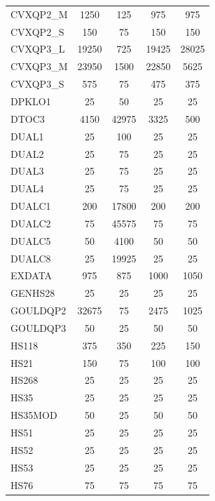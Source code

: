 \begin{longtable}{lcccc}
CVXQP2\_M &     1250 &   125 &      975 &      975 \\
CVXQP2\_S &      150 &    75 &      150 &      150 \\
CVXQP3\_L &    19250 &   725 &    19425 &    28025 \\
CVXQP3\_M &    23950 &  1500 &    22850 &     5625 \\
CVXQP3\_S &      575 &    75 &      475 &      375 \\
DPKLO1   &       25 &    50 &       25 &       25 \\
DTOC3    &     4150 & 42975 &     3325 &      500 \\
DUAL1    &       25 &   100 &       25 &       25 \\
DUAL2    &       25 &    75 &       25 &       25 \\
DUAL3    &       25 &    75 &       25 &       25 \\
DUAL4    &       25 &    75 &       25 &       25 \\
DUALC1   &      200 & 17800 &      200 &      200 \\
DUALC2   &       75 & 45575 &       75 &       75 \\
DUALC5   &       50 &  4100 &       50 &       50 \\
DUALC8   &       25 & 19925 &       25 &       25 \\
EXDATA   &      975 &   875 &     1000 &     1050 \\
GENHS28  &       25 &    25 &       25 &       25 \\
GOULDQP2 &    32675 &    75 &     2475 &     1025 \\
GOULDQP3 &       50 &    25 &       50 &       50 \\
HS118    &      375 &   350 &      225 &      150 \\
HS21     &      150 &    75 &      100 &      100 \\
HS268    &       25 &    25 &       25 &       25 \\
HS35     &       25 &    25 &       25 &       25 \\
HS35MOD  &       50 &    25 &       50 &       50 \\
HS51     &       25 &    25 &       25 &       25 \\
HS52     &       25 &    25 &       25 &       25 \\
HS53     &       25 &    25 &       25 &       25 \\
HS76     &       75 &    75 &       75 &       75 \\

\end{longtable}
